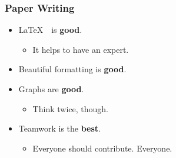 \documentclass{beamer}
\begin{document}
\begin{frame}
    \frametitle{Paper Writing}
    \begin{itemize}
        \setlength{\itemsep}{10pt}
        \item \LaTeX $\textrm{ }$ is \textbf{good}.
        \begin{itemize}
            \item It helps to have an expert.
        \end{itemize}
        \item Beautiful formatting is \textbf{good}.
        \item Graphs are \textbf{good}.
        \begin{itemize}
            \item Think twice, though.
        \end{itemize}
        \item Teamwork is the \textbf{best}.
        \begin{itemize}
            \item Everyone should contribute. Everyone.
        \end{itemize}
    \end{itemize}
\end{frame}
\end{document}

